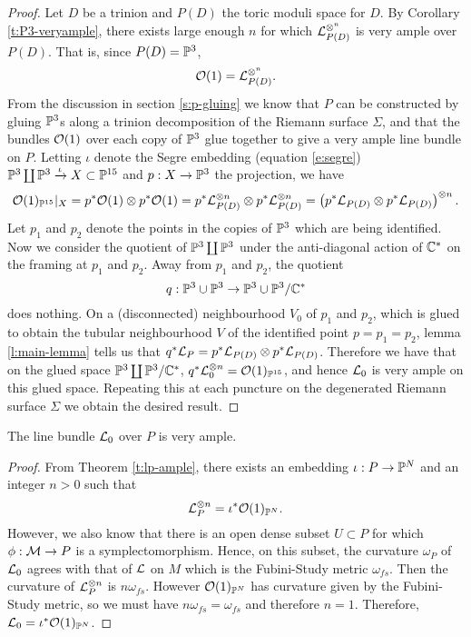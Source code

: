 \begin{proof}
	Let $D$ be a trinion and $P(D)$ the toric moduli space for $D$. By Corollary \ref{t:P3-veryample}, there exists large enough $n$ for which $\mathcal{L}_{P(D)}^{\otimes^n}$ is very ample over $P(D)$. That is, since $P(D) = \mathbb{P}^3$,
	\begin{equation}
	\mathcal{O}(1) = \mathcal{L}_{P(D)}^{\otimes^n}.
	\end{equation}
	From the discussion in section \ref{s:p-gluing} we know that $P$ can be constructed by gluing $\mathbb{P}^3$s along a trinion decomposition of the Riemann surface $\Sigma$, and that the bundles $\mathcal{O}(1)$ over each copy of $\mathbb{P}^3$ glue together to give a very ample line bundle on $P$. Letting $\iota$ denote the Segre embedding (equation \ref{e:segre}) $\mathbb{P}^3 \coprod \mathbb{P}^3 \xrightarrow{\iota} X\subset \mathbb{P}^{15}$ and $p:X\to \mathbb{P}^3$ the projection, we have
	\begin{equation}
	\mathcal{O}(1)_{\mathbb{P}^{15}}|_X = p^\ast \mathcal{O}(1)\otimes p^\ast \mathcal{O}(1) = p^\ast \mathcal{L}_{P(D)}^{\otimes n}\otimes p^\ast \mathcal{L}_{P(D)}^{\otimes n} = \left(p^\ast \mathcal{L}_{P(D)}\otimes p^\ast \mathcal{L}_{P(D)}\right)^{\otimes n}.
	\end{equation}
	Let $p_1$ and $p_2$ denote the points in the copies of $\mathbb{P}^3$ which are being identified. Now we consider the quotient of $\mathbb{P}^3 \coprod \mathbb{P}^3$ under the anti-diagonal action of $\mathbb{C}^\ast$ on the framing at $p_1$ and $p_2$. Away from $p_1$ and $p_2$, the quotient
	\begin{equation}
	q: \mathbb{P}^3 \cup \mathbb{P}^3 \to \mathbb{P}^3 \cup \mathbb{P}^3 / \mathbb{C}^\ast
	\end{equation}
	does nothing. On a (disconnected) neighbourhood $V_0$ of $p_1$ and $p_2$, which is glued to obtain the tubular neighbourhood $V$ of the identified point $p=p_1=p_2$, lemma \ref{l:main-lemma} tells us that $q^\ast \mathcal{L}_{P} = p^\ast \mathcal{L}_{P(D)}\otimes p^\ast \mathcal{L}_{P(D)}$. Therefore we have that on the glued space $\mathbb{P}^3\coprod \mathbb{P}^3 / \mathbb{C}^\ast$, $q^\ast \mathcal{L}_0^{\otimes n} = \mathcal{O}(1)_{\mathbb{P}^{15}}$, and hence $\mathcal{L}_0$ is very ample on this glued space. Repeating this at each puncture on the degenerated Riemann surface $\Sigma$ we obtain the desired result.
\end{proof}
\begin{corollary}
	The line bundle $\mathcal{L}_0$ over $P$ is very ample.
\end{corollary}
\begin{proof}
	From Theorem \ref{t:lp-ample}, there exists an embedding $\iota:P\to\mathbb{P}^N$ and an integer $n>0$ such that
	\begin{equation}
	\mathcal{L}^{\otimes n}_P = \iota^\ast \mathcal{O}(1)_{\mathbb{P}^N}.
	\end{equation}
	However, we also know that there is an open dense subset $U \subset P$ for which $\phi:\mathcal{M}\to P$ is a symplectomorphism. Hence, on this subset, the curvature $\omega_P$ of $\mathcal{L}_0$ agrees with that of $\mathcal{L}$ on $M$ which is the Fubini-Study metric $\omega_{fs}$. Then the curvature of $\mathcal{L}^{\otimes n}_P$ is $n\omega_{fs}$. However $\mathcal{O}(1)_{\mathbb{P}^N}$ has curvature given by the Fubini-Study metric, so we must have $n\omega_{fs} = \omega_{fs}$ and therefore $n=1$. Therefore, $\mathcal{L}_0 = \iota^\ast \mathcal{O}(1)_{\mathbb{P}^N}$.
\end{proof}
